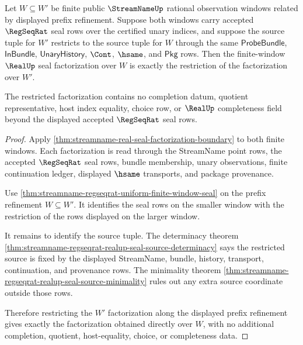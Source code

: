 \begin{theorem}
\label{thm:streamname-real-seal-factorization-refinement-stability}
Let $W \subseteq W'$ be finite public $\StreamNameUp$ rational observation
windows related by displayed prefix refinement. Suppose both windows carry
accepted $\RegSeqRat$ seal rows over the certified unary indices, and suppose
the source tuple for $W'$ restricts to the source tuple for $W$ through the same
$\mathsf{ProbeBundle}$, $\mathsf{InBundle}$, $\mathsf{UnaryHistory}$, $\Cont$,
$\hsame$, and $\mathsf{Pkg}$ rows. Then the finite-window $\RealUp$ seal
factorization over $W$ is exactly the restriction of the factorization over
$W'$.

The restricted factorization contains no completion datum, quotient
representative, host index equality, choice row, or $\RealUp$ completeness
field beyond the displayed accepted $\RegSeqRat$ seal rows.
\end{theorem}
\begin{proof}
Apply \autoref{thm:streamname-real-seal-factorization-boundary} to both finite
windows. Each factorization is read through the StreamName point rows, the
accepted $\RegSeqRat$ seal rows, bundle membership, unary observations, finite
continuation ledger, displayed $\hsame$ transports, and package provenance.

Use \autoref{thm:streamname-regseqrat-uniform-finite-window-seal} on the prefix
refinement $W \subseteq W'$. It identifies the seal rows on the smaller window
with the restriction of the rows displayed on the larger window.

It remains to identify the source tuple. The determinacy theorem
\autoref{thm:streamname-regseqrat-realup-seal-source-determinacy} says the
restricted source is fixed by the displayed StreamName, bundle, history,
transport, continuation, and provenance rows. The minimality theorem
\autoref{thm:streamname-regseqrat-realup-seal-source-minimality} rules out any
extra source coordinate outside those rows.

Therefore restricting the $W'$ factorization along the displayed prefix
refinement gives exactly the factorization obtained directly over $W$, with no
additional completion, quotient, host-equality, choice, or completeness data.
\end{proof}

